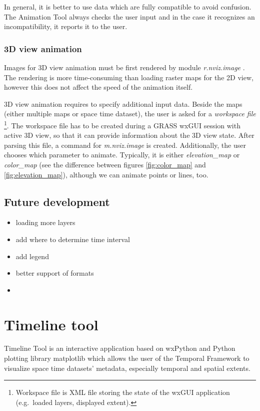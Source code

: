 \documentclass[a4paper,12pt,oneside]{book}
\newcommand{\module}[1]{\textsl{#1}}
\newcommand{\tf}{Temporal Framework\xspace}
\newcommand{\at}{Animation Tool\xspace}
\begin{document}
In general, it is better to use data which are fully compatible to avoid confusion.
The \at always checks the user input and in the case it recognizes an incompatibility, it reports it to the user.


\subsubsection{3D view animation}
\label{sec:3dViewAnimation}
Images for 3D view animation must be first rendered by module \module{r.nviz.image} \cite{grassUserMan}.
The rendering is more time-consuming than loading raster maps for the 2D view,
however this does not affect the speed of the animation itself.

3D view animation requires to specify additional input data.
Beside the maps (either multiple maps or space time dataset), the user is asked for a \emph{workspace file}%
\footnote{Workspace file is XML file storing the state of the wxGUI application (e.g.\ loaded layers, displayed extent).}.
The workspace file has to be created during a GRASS wxGUI session with active 3D view,
so that it can provide information about the 3D view state. After parsing this file, a command for \module{m.nviz.image}
is created.
Additionally, the user chooses which parameter to animate.
Typically, it is either \emph{elevation\_map} or \emph{color\_map}
(see the difference between figures \ref{fig:color_map} and \ref{fig:elevation_map}),
although we can animate points or lines, too.

\subsection{Future development}
\begin{itemize}
  \item loading more layers
  \item add where to determine time interval
  \item add legend
  \item better support of formats
  \item 
\end{itemize}



\section{Timeline tool}
Timeline Tool is an interactive application based on wxPython and Python plotting library matplotlib \cite{matplotlib} which allows
the user of the \tf to visualize space time datasets' metadata, especially temporal and spatial extents.
\end{document}
